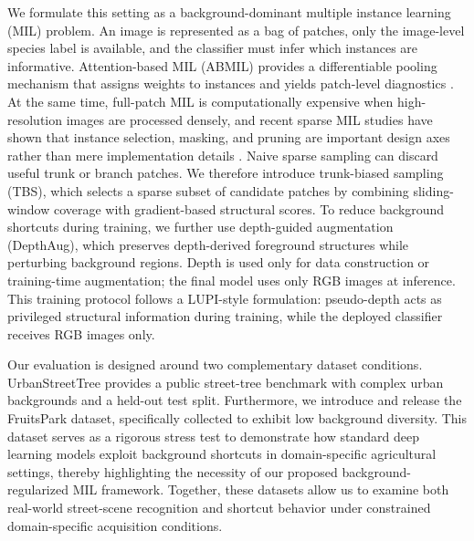 \documentclass{ieeeaccess}
\begin{document}
We formulate this setting as a background-dominant multiple instance learning (MIL) problem. An
image is represented as a bag of patches, only the image-level species label is available, and the
classifier must infer which instances are informative. Attention-based MIL (ABMIL) provides a
differentiable pooling mechanism that assigns weights to instances and yields patch-level
diagnostics \cite{abmil}. At the same time, full-patch MIL is computationally expensive when
high-resolution images are processed densely, and recent sparse MIL studies have shown that instance
selection, masking, and pruning are important design axes rather than mere implementation details
\cite{pamil,mhim,acmil,keypatches,hdmil}. Naive sparse sampling can discard useful trunk or branch
patches. We therefore introduce trunk-biased sampling (TBS), which selects a sparse subset of
candidate patches by combining sliding-window coverage with gradient-based structural scores. To
reduce background shortcuts during training, we further use depth-guided augmentation (DepthAug),
which preserves depth-derived foreground structures while perturbing background regions. Depth is
used only for data construction or training-time augmentation; the final model uses only RGB images
at inference. This training protocol follows a LUPI-style formulation: pseudo-depth acts as
privileged structural information during training, while the deployed classifier receives RGB
images only.

Our evaluation is designed around two complementary dataset conditions. UrbanStreetTree provides a
public street-tree benchmark with complex urban backgrounds and a held-out test split.
Furthermore, we introduce and release the FruitsPark dataset, specifically collected to exhibit low
background diversity. This dataset serves as a rigorous stress test to demonstrate how standard
deep learning models exploit background shortcuts in domain-specific agricultural settings,
thereby highlighting the necessity of our proposed background-regularized MIL framework. Together,
these datasets allow us to examine both real-world street-scene recognition and shortcut behavior
under constrained domain-specific acquisition conditions.
\end{document}
